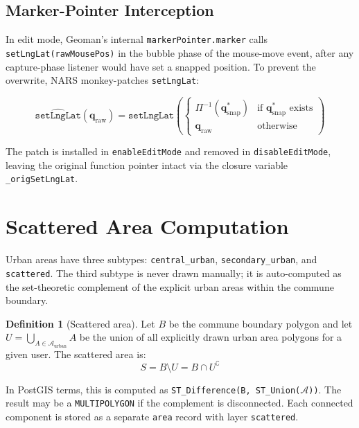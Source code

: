 \documentclass[12pt,a4paper]{article}
\theoremstyle{definition}
\newtheorem{definition}{Definition}[section]
\theoremstyle{plain}
\theoremstyle{remark}
\newcommand{\vect}[1]{\mathbf{#1}}
\begin{document}
\subsection{Marker-Pointer Interception}

In edit mode, Geoman's internal \texttt{markerPointer.marker} calls
\texttt{setLngLat(rawMousePos)} in the bubble phase of the mouse-move
event, after any capture-phase listener would have set a snapped position.
To prevent the overwrite, NARS monkey-patches \texttt{setLngLat}:

\begin{equation}
  \widehat{\texttt{setLngLat}}(\vect{q}_{\text{raw}}) =
  \texttt{setLngLat}\!\left(
    \begin{cases}
      \Pi^{-1}(\vect{q}^*_{\text{snap}}) & \text{if } \vect{q}^*_{\text{snap}} \text{ exists} \\
      \vect{q}_{\text{raw}}              & \text{otherwise}
    \end{cases}
  \right)
  \label{eq:marker_patch}
\end{equation}

The patch is installed in \texttt{enableEditMode} and removed in
\texttt{disableEditMode}, leaving the original function pointer intact via
the closure variable \texttt{\_origSetLngLat}.

\section{Scattered Area Computation}
\label{sec:scattered}

Urban areas have three subtypes: \texttt{central\_urban},
\texttt{secondary\_urban}, and \texttt{scattered}. The third subtype is
never drawn manually; it is auto-computed as the set-theoretic complement
of the explicit urban areas within the commune boundary.

\begin{definition}[Scattered area]
Let $B$ be the commune boundary polygon and let
$U = \bigcup_{A \in \mathcal{A}_{\text{urban}}} A$
be the union of all explicitly drawn urban area polygons for a given user.
The scattered area is:
\begin{equation}
  S = B \setminus U = B \cap U^{\complement}
  \label{eq:scattered}
\end{equation}
\end{definition}

In PostGIS terms, this is computed as
\texttt{ST\_Difference(B, ST\_Union($\mathcal{A}$))}.
The result may be a \texttt{MULTIPOLYGON} if the complement is
disconnected. Each connected component is stored as a separate
\texttt{area} record with layer \texttt{scattered}.
\end{document}
